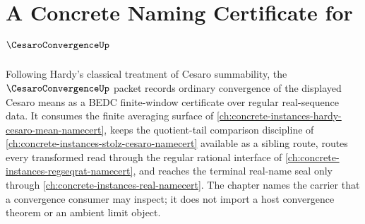 \chapter{A Concrete Naming Certificate for $\CesaroConvergenceUp$}
\label{ch:concrete-instances-cesaro-convergence-namecert}

Following Hardy's classical treatment of Cesaro summability, the $\CesaroConvergenceUp$ packet records ordinary convergence of the displayed Cesaro means as a BEDC finite-window certificate over regular real-sequence data. It consumes the finite averaging surface of \autoref{ch:concrete-instances-hardy-cesaro-mean-namecert}, keeps the quotient-tail comparison discipline of \autoref{ch:concrete-instances-stolz-cesaro-namecert} available as a sibling route, routes every transformed read through the regular rational interface of \autoref{ch:concrete-instances-regseqrat-namecert}, and reaches the terminal real-name seal only through \autoref{ch:concrete-instances-real-namecert}. The chapter names the carrier that a convergence consumer may inspect; it does not import a host convergence theorem or an ambient limit object.

